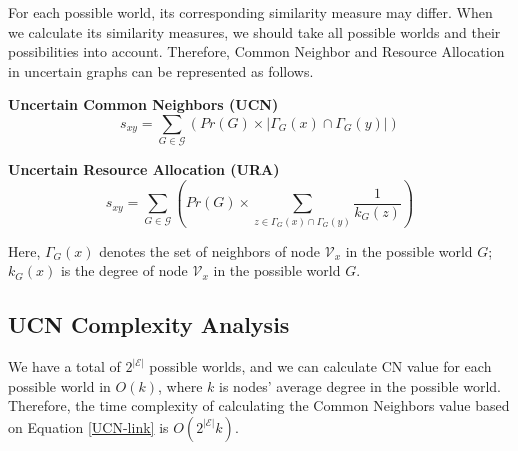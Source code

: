 \documentclass[\main/thesis.tex]{subfiles}
\begin{document}
For each possible world, its corresponding similarity measure may differ. When we calculate its similarity measures, we should take all possible worlds and their possibilities into account. Therefore, Common Neighbor and Resource Allocation in uncertain graphs can be represented as follows.

\textbf{Uncertain Common Neighbors (UCN)}
\begin{equation}
s_{xy}=\sum_{G\in \mathcal{G}}( Pr(G)\times|\Gamma_G(x)\cap\Gamma_G(y)|) \label{UCN-link}
\end{equation}

\textbf{Uncertain Resource Allocation (URA)}
\begin{equation}
s_{xy}=\sum_{G\in \mathcal{G}}( Pr(G)\times\sum_{z\in \Gamma_G(x)\cap\Gamma_G(y)}\frac{1}{k_G(z)}) \label{URA-link}
\end{equation}

Here, $\Gamma_G(x)$ denotes the set of neighbors of node $\mathcal{V}_x$ in the possible world $G$; $k_G(x)$ is the degree of node $\mathcal{V}_x$ in the possible world $G$.

\subsection{UCN Complexity Analysis} \label{CN-Complexity-Analysis}
We have a total of $2^{|\mathcal{E}|}$ possible worlds, and we can calculate CN value for each possible world in $O(k)$, where $k$ is nodes' average degree in the possible world. Therefore, the time complexity of calculating the Common Neighbors value based on Equation \ref{UCN-link} is $O(2^{|\mathcal{E}|}k)$.
\end{document}
